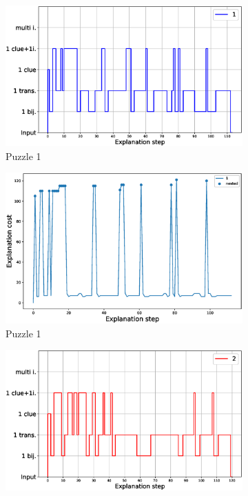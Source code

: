 \begin{figure}[t!]
	\centering
	\begin{subfigure}{.5\textwidth}
		\centering
		\includegraphics[width=0.9\linewidth]{figures/plot_cost_steps_1.eps}
		\caption{Puzzle 1}
		\label{fig:composition_puzzle:p1}
	\end{subfigure}%
	\begin{subfigure}{.5\textwidth}
		\centering
		\includegraphics[width=0.84\linewidth]{figures/1.eps}
		\caption{Puzzle 1}
		\label{fig:cost_puzzle:p1}
	\end{subfigure}
	\begin{subfigure}{.5\textwidth}
		\centering
		\includegraphics[width=0.9\linewidth]{figures/plot_cost_steps_2.eps}

\end{subfigure}
\end{figure}
